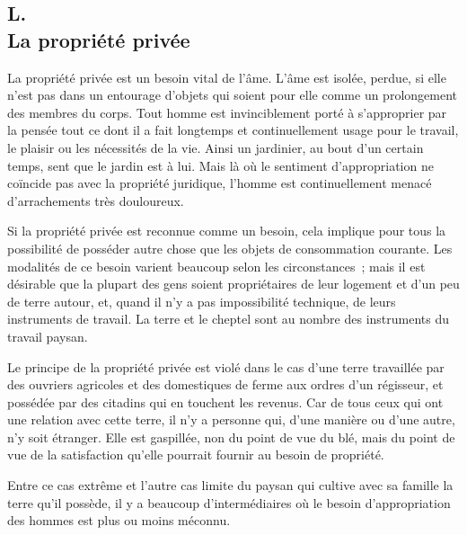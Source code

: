 \documentclass[french,twoside]{book} %
\begin{document}
\subsection[{L. La propriété privée}]{L. \\
La propriété privée}
\noindent \par
La propriété privée est un besoin vital de l'âme. L'âme est isolée, perdue, si elle n'est pas dans un entourage d'objets qui soient pour elle comme un prolongement des membres du corps. Tout homme est invinciblement porté à s'approprier par la pensée tout ce dont il a fait longtemps et continuellement usage pour le travail, le plaisir ou les nécessités de la vie. Ainsi un jardinier, au bout d'un certain temps, sent que le jardin est à lui. Mais là où le sentiment d'appropriation ne coïncide pas avec la propriété juridique, l'homme est continuellement menacé d'arrachements très douloureux.\par
Si la propriété privée est reconnue comme un besoin, cela implique pour tous la possibilité de posséder autre chose que les objets de consommation courante. Les modalités de ce besoin varient beaucoup selon les circonstances ; mais il est désirable que la plupart des gens soient propriétaires de leur logement et d'un peu de terre autour, et, quand il n'y a pas impossibilité technique, de leurs instruments de travail. La terre et le cheptel sont au nombre des instruments du travail paysan.\par
Le principe de la propriété privée est violé dans le cas d'une terre travaillée par des ouvriers agricoles et des domestiques de ferme aux ordres d'un régisseur, et possédée par des citadins qui en touchent les revenus. Car de tous ceux qui ont une relation avec cette terre, il n'y a personne qui, d'une manière ou d'une autre, n'y soit étranger. Elle est gaspillée, non du point de vue du blé, mais du point de vue de la satisfaction qu'elle pourrait fournir au besoin de propriété.\par
Entre ce cas extrême et l'autre cas limite du paysan qui cultive avec sa famille la terre qu'il possède, il y a beaucoup d'intermédiaires où le besoin d'appropriation des hommes est plus ou moins méconnu.
\end{document}
